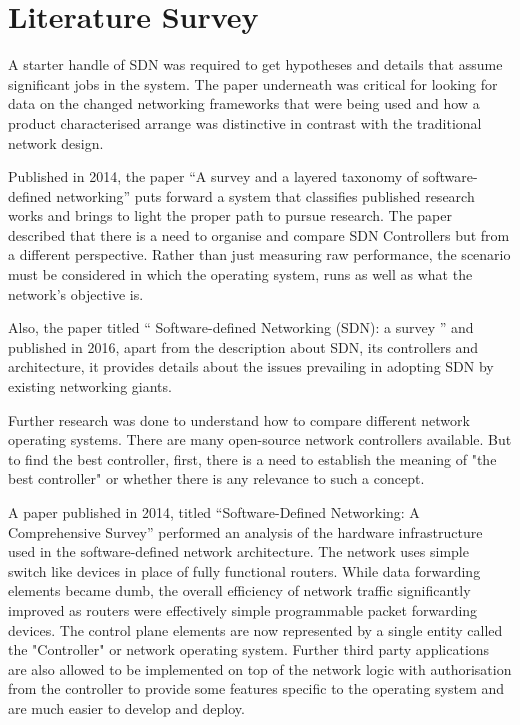 \chapter{Literature Survey}

A starter handle of SDN was required to get hypotheses and details that assume significant jobs in the system. The paper underneath was critical for looking for data on the changed networking frameworks that were being used and how a product characterised arrange was distinctive in contrast with the traditional network design.

Published in 2014, the paper ``A survey and a layered taxonomy of software-defined networking'' \cite{taxonomy2014} puts forward a system that classifies published research works and brings to light the proper path to pursue research. The paper described that there is a need to organise and compare SDN Controllers but from a different perspective. Rather than just measuring raw performance, the scenario must be considered in which the operating system, runs as well as what the network's objective is.

Also, the paper titled `` Software-defined Networking (SDN): a survey ''\cite{benzekki2016survey} and published in 2016, apart from the description about SDN, its controllers and architecture, it provides details about the issues prevailing in adopting SDN by existing networking giants.

Further research was done to understand how to compare different network operating systems. There are many open-source network controllers available. But to find the best controller, first, there is a need to establish the meaning of "the best controller" or whether there is any relevance to such a concept.

A paper published in 2014, titled ``Software-Defined Networking: A Comprehensive Survey'' \cite{Survey2014} performed an analysis of the hardware infrastructure used in the software-defined network architecture. The network uses simple switch like devices in place of fully functional routers. While data forwarding elements became dumb, the overall efficiency of network traffic significantly improved as routers were effectively simple programmable packet forwarding devices. The control plane elements are now represented by a single entity called the "Controller" or network operating system. Further third party applications are also allowed to be implemented on top of the network logic with authorisation from the controller to provide some features specific to the operating system and are much easier to develop and deploy.

